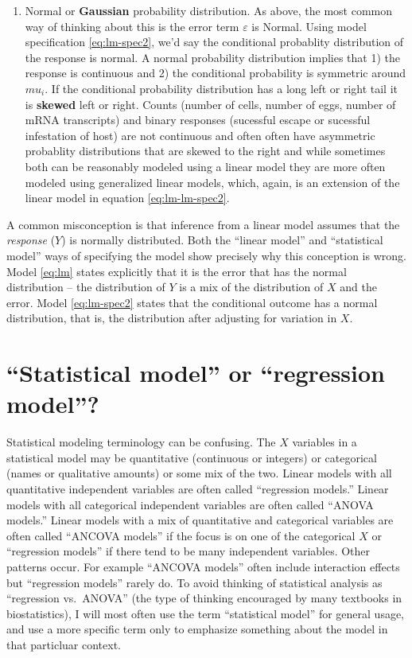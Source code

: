 \documentclass[]{book}
\providecommand{\tightlist}{%
  \setlength{\itemsep}{0pt}\setlength{\parskip}{0pt}}
\begin{document}
\begin{enumerate}
\def\labelenumi{\arabic{enumi}.}
\setcounter{enumi}{1}
\tightlist
\item
  Normal or \textbf{Gaussian} probability distribution. As above, the
  most common way of thinking about this is the error term
  \(\varepsilon\) is Normal. Using model specification
  \eqref{eq:lm-spec2}, we'd say the conditional probablity distribution of
  the response is normal. A normal probability distribution implies that
  1) the response is continuous and 2) the conditional probability is
  symmetric around \(mu_i\). If the conditional probability distribution
  has a long left or right tail it is \textbf{skewed} left or right.
  Counts (number of cells, number of eggs, number of mRNA transcripts)
  and binary responses (sucessful escape or sucessful infestation of
  host) are not continuous and often often have asymmetric probablity
  distributions that are skewed to the right and while sometimes both
  can be reasonably modeled using a linear model they are more often
  modeled using generalized linear models, which, again, is an extension
  of the linear model in equation \eqref{eq:lm-lm-spec2}.
\end{enumerate}

A common misconception is that inference from a linear model assumes
that the \emph{response} (\(Y\)) is normally distributed. Both the
``linear model'' and ``statistical model'' ways of specifying the model
show precisely why this conception is wrong. Model \eqref{eq:lm} states
explicitly that it is the error that has the normal distribution -- the
distribution of \(Y\) is a mix of the distribution of \(X\) and the
error. Model \eqref{eq:lm-spec2} states that the conditional outcome has a
normal distribution, that is, the distribution after adjusting for
variation in \(X\).

\section{\texorpdfstring{``Statistical model'' or ``regression
model''?}{Statistical model or regression model?}}\label{statistical-model-or-regression-model}

Statistical modeling terminology can be confusing. The \(X\) variables
in a statistical model may be quantitative (continuous or integers) or
categorical (names or qualitative amounts) or some mix of the two.
Linear models with all quantitative independent variables are often
called ``regression models.'' Linear models with all categorical
independent variables are often called ``ANOVA models.'' Linear models
with a mix of quantitative and categorical variables are often called
``ANCOVA models'' if the focus is on one of the categorical \(X\) or
``regression models'' if there tend to be many independent variables.
Other patterns occur. For example ``ANCOVA models'' often include
interaction effects but ``regression models'' rarely do. To avoid
thinking of statistical analysis as ``regression vs.~ANOVA'' (the type
of thinking encouraged by many textbooks in biostatistics), I will most
often use the term ``statistical model'' for general usage, and use a
more specific term only to emphasize something about the model in that
particluar context.
\end{document}
